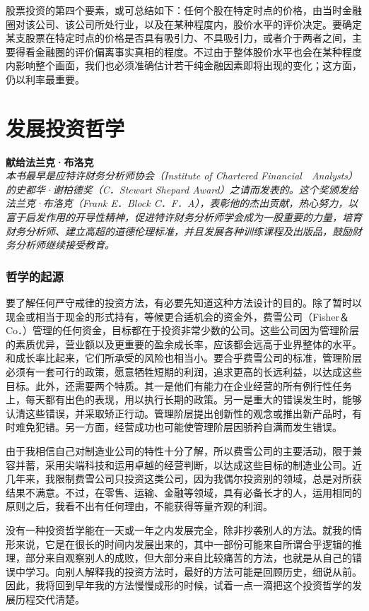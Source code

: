 \documentclass[UTF8,a4paper,zihao=-4,fontset = windows]{ctexart} %
\begin{document}
股票投资的第四个要素，或可总结如下：任何个股在特定时点的价格，由当时金融圈对该公司、该公司所处行业，以及在某种程度内，股价水平的评价决定。要确定某支股票在特定时点的价格是否具有吸引力、不具吸引力，或者介于两者之间，主要得看金融圈的评价偏离事实真相的程度。不过由于整体股价水平也会在某种程度内影响整个画面，我们也必须准确估计若干纯金融因素即将出现的变化；这方面，仍以利率最重要。
\newpage

\part{发展投资哲学}

\textbf{献给法兰克·布洛克}
\\

\textit{本书最早是应特许财务分析师协会（Institute of Chartered Financial　Analysts）的史都华·谢柏德奖（C．Stewart Shepard Award）之请而发表的。这个奖颁发给法兰克·布洛克（Frank E．Block C．F．A），表彰他的杰出贡献，热心努力，以富于启发作用的开导性精神，促进特许财务分析师学会成为一股重要的力量，培育财务分析师、建立高超的道德伦理标准，并且发展各种训练课程及出版品，鼓励财务分析师继续接受教育。}

\section{哲学的起源}

要了解任何严守戒律的投资方法，有必要先知道这种方法设计的目的。除了暂时以现金或相当于现金的形式持有，等候更合适机会的资金外，费雪公司（Fisher＆Co．）管理的任何资金，目标都在于投资非常少数的公司。这些公司因为管理阶层的素质优异，营业额以及更重要的盈余成长率，应该都会远高于业界整体的水平。和成长率比起来，它们所承受的风险也相当小。要合乎费雪公司的标准，管理阶层必须有一套可行的政策，愿意牺牲短期的利润，追求更高的长远利益，以达成这些目标。此外，还需要两个特质。其一是他们有能力在企业经营的所有例行性任务上，每天都有出色的表现，用以执行长期的政策。另一是重大的错误发生时，能够认清这些错误，并采取矫正行动。管理阶层提出创新性的观念或推出新产品时，有时难免犯错。另一方面，经营成功也可能使管理阶层因骄矜自满而发生错误。

由于我相信自己对制造业公司的特性十分了解，所以费雪公司的主要活动，限于兼容并蓄，采用尖端科技和运用卓越的经营判断，以达成这些目标的制造业公司。近几年来，我限制费雪公司只投资这类公司，因为我偶尔投资别的领域，总是对所获结果不满意。不过，在零售、运输、金融等领域，具有必备长才的人，运用相同的原则之后，我看不出有任何理由，不能获得等量齐观的利润。

没有一种投资哲学能在一天或一年之内发展完全，除非抄袭别人的方法。就我的情形来说，它是在很长的时间内发展出来的，其中一部份可能来自所谓合乎逻辑的推理，部分来自观察别人的成败，但大部分来自比较痛苦的方法，也就是从自己的错误中学习。向别人解释我的投资方法时，最好的方法可能是回顾历史，细说从前。因此，我将回到早年我的方法慢慢成形的时候，试着一点一滴把这个投资哲学的发展历程交代清楚。
\\
\end{document}
